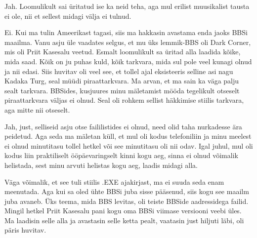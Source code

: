 
Jah. Loomulikult  sai üritatud ise ka neid teha, aga mul erilist muusikalist 
tausta ei ole, nii et sellest midagi välja ei tulnud.


Ei. Kui ma tulin Ameerikast tagasi, siis ma hakkasin avastama enda jaoks  BBSi 
maailma. Vanu asju üle vaadates selgus, et mu üks lemmik-BBS oli Dark 
Corner, mis oli Priit Kasesalu veetud. Esmalt loomulikult sa üritad  alla laadida kõike, mida saad. 
Kõik on ju puhas kuld, kõik tarkvara, mida sul pole veel kunagi olnud ja nii 
edasi. Siis huvitav oli veel see, et tollel ajal eksisteeris selline asi nagu 
Kadaka Turg, seal müüdi piraattarkvara. Ma arvan, et ma sain 
ka väga palju sealt tarkvara. BBSides, kusjuures minu mäletamist mööda 
tegelikult otseselt piraattarkvara väljas ei olnud. Seal oli rohkem sellist 
häkkimise stiilis tarkvara, aga mitte nii otseselt.


Jah, just, selliseid asju otse faililistides ei olnud, need olid taha 
nurkadesse ära peidetud. Aga seda ma mäletan küll, et mul oli kodus 
telefoniliin ja minu meelest ei olnud minutitasu tollel hetkel või see  
minutitasu oli nii odav. Igal juhul, mul oli kodus liin praktiliselt 
ööpäevaringselt kinni kogu aeg, sinna ei olnud võimalik helistada, sest minu 
arvuti helistas kogu aeg, laadis midagi alla.


Väga võimalik, et see tuli stiilis .EXE ajakirjast, ma ei suuda 
seda enam meenutada. Aga kui sa oled ühte BBSi juba sisse pääsenud, siis kogu 
see maailm juba avaneb. Üks teema, mida BBS levitas, oli teiste BBSide 
aadressidega failid. Mingil hetkel Priit Kasesalu 
pani kogu oma BBSi viimase versiooni veebi üles. Ma laadisin selle alla ja 
avastasin selle  ketta pealt, vaatasin just hiljuti läbi, oli  päris huvitav. 

